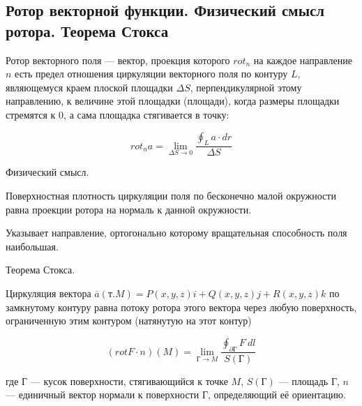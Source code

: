 \subsection{Ротор векторной функции. Физический смысл ротора. Теорема Стокса}

\begin{definition}
    Ротор векторного поля — вектор, проекция которого $rot_n$ на каждое направление $n$ есть предел отношения циркуляции векторного поля 
    по контуру $L$, являющемуся краем плоской площадки $\Delta S$, перпендикулярной этому направлению, 
    к величине этой площадки (площади), когда размеры площадки стремятся к 0, а сама площадка стягивается в точку:

    $$
    rot_na=\lim_{\Delta S\to0}\frac{\oint_La\cdot dr}{\Delta S}
    $$
\end{definition}

\begin{remark}
    Физический смысл.

    Поверхностная плотность циркуляции поля по бесконечно малой окружности равна проекции ротора на нормаль к данной окружности.

    Указывает направление, ортогонально которому вращательная способность поля наибольшая.
\end{remark}

\begin{theorem}
    Теорема Стокса.

    Циркуляция вектора $\overline a(т.M)=P(x,y,z)i+Q(x,y,z)j+R(x,y,z)k$ по замкнутому контуру равна потоку ротора этого вектора 
    через любую поверхность, ограниченную этим контуром (натянутую на этот контур)
    
    $$
    (rotF\cdot n)(M)=\lim_{Г\to M}\frac{\oint_{\partial Г}F\ dl}{S(Г)}
    $$

    где $Г$ — кусок поверхности, стягивающийся к точке $M$,
    $S(Г)$ — площадь $Г$,
    $n$ — единичный вектор нормали к поверхности $Г$, определяющий её ориентацию.
\end{theorem}